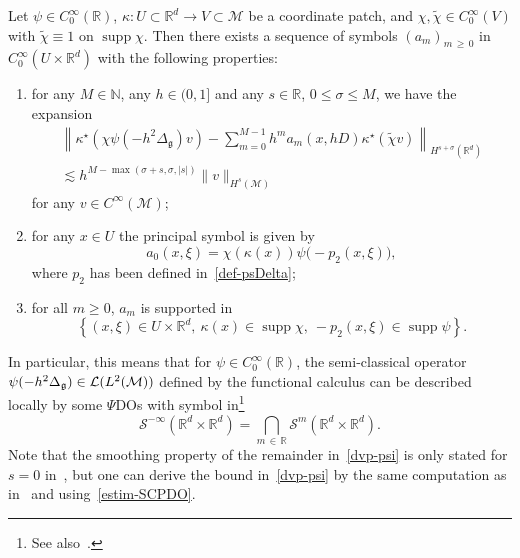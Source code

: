 \documentclass[10pt]{amsart}
\theoremstyle{definition}\newtheorem{defi}[theo]{Definition}\newtheorem{rema}[theo]{Remark}\newtheorem{exam}[theo]{Example}\newtheorem{exem}[theo]{Example}\newtheorem{nota}[theo]{Notation}
\newcommand{\R}{\mathbb{R}}
\newcommand{\N}{\mathbb{N}}
\DeclareMathOperator*{\supp}{supp}
\renewcommand{\L}{\mathcal{L}}
\renewcommand{\S}{\mathcal{S}}
\newcommand{\M}{\mathcal{M}}
\newcommand{\g}{\mathfrak{g}}
\newcommand{\Dlg}{\Delta_{\g}}
\newcommand{\kk}{\kappa}
\newcommand{\s}{\sigma}
\newcommand{\wt}{\widetilde}
\newcommand{\les}{\lesssim}
\newcommand*{\romanenumi}{\renewcommand*{\theenumi}{\roman{enumi}}}
\begin{document}
\begin{prop}\label{prop-dvp}
Let $\psi\in C^{\infty}_0(\R)$, $\kk: U\subset \R^d\rightarrow V\subset \M$ be a coordinate patch, and $\chi,\widetilde{\chi}\in C^{\infty}_0(V)$ with $\widetilde{\chi}\equiv 1$ on $\supp\chi$. Then there exists a sequence of symbols $(a_m)_{m\,\geq\,0}$ in $C^{\infty}_0(U\times\R^d)$ with the following properties:
\begin{enumerate}\romanenumi
\item\label{prop2.2.i} for any $M\in\N$, any $h\in (0,1]$ and any $s\in\R$, $0\le \s \le M$, we have the expansion
\begin{multline}\label{dvp-psi}
\left\|\kk^{\star}\left(\chi\psi\left(-h^2\Dlg\right)v\right) - \sum_{m=0}^{M-1}h^ma_m(x,hD)\kk^\star(\wt\chi v)\right\|_{H^ {s+\s}\left(\R^d\right)}\\
 \les h^{M-\max(\s+s,\s,|s|)}\|v\|_{H^s(\M)}
\end{multline}
for any $v\in C^{\infty}(\M)$;
\item\label{prop2.2.ii} for any $x\in U$ the principal symbol is given by
\begin{equation*}
a_0(x,\xi)= \chi(\kk(x))\psi\big(-p_2(x,\xi)\big),
\end{equation*}
where $p_2$ has been defined in~\eqref{def-psDelta};
 
\item\label{prop2.2.iii} for all $m\geq 0$, $a_m$ is supported in
\begin{equation}\label{support}
\left\{(x,\xi)\in U\times\R^d,~\kk(x)\in\supp\chi,~-p_2(x,\xi)\in \supp \psi\right\}.
\end{equation}
\end{enumerate}
\end{prop}

In particular, this means that for $\psi\in C^{\infty}_0(\R)$, the semi-classical operator $\psi(-h^2\Dlg)\linebreak\in\L(L^2(\M))$ defined by the functional calculus can be described locally by some $\Psi$DOs with symbol in\footnote{See also~\cite[Section~14.3.2]{Zworski}.}
\begin{equation*}
\S^{-\infty}\left(\R^d\times\R^d\right)=\bigcap_{m\,\in\,\R}\S^m\left(\R^d\times\R^d\right).
\end{equation*}
Note that the smoothing property of the remainder in~\eqref{dvp-psi} is only stated for $s=0$ in~\cite[Proposition~2.1]{BGT}, but one can derive the bound in~\eqref{dvp-psi} by the same computation as in~\cite{BGT} and using~\eqref{estim-SCPDO}.
\end{document}
